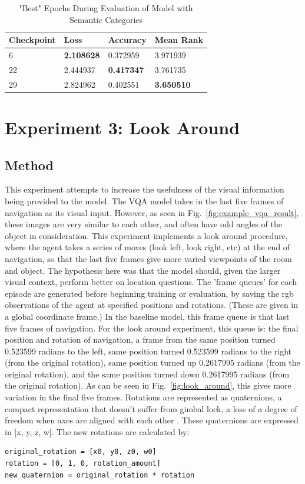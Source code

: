 \begin{table}[H]
\centering
\caption{"Best" Epochs During Evaluation of Model with Semantic Categories}
\begin{tabular}{l | l | l | l}
Checkpoint & Loss & Accuracy & Mean Rank \\
\hline
6 & \textbf{2.108628} & 0.372959 & 3.971939 \\
22 & 2.444937 & \textbf{0.417347} & 3.761735 \\
29 & 2.824962 & 0.402551 & \textbf{3.650510} 
\end{tabular}
\label{tab:best_category}
\end{table}

\section{Experiment 3: Look Around}
\label{sec:exp_3}
\subsection{Method}
This experiment attempts to increase the usefulness of the visual information being provided to the model. The VQA model takes in the last five frames of navigation as its visual input. However, as seen in Fig.~\ref{fig:example_vqa_result}, these images are very similar to each other, and often have odd angles of the object in consideration. This experiment implements a look around procedure, where the agent takes a series of moves (look left, look right, etc) at the end of navigation, so that the last five frames give more varied viewpoints of the room and object. The hypothesis here was that the model should, given the larger visual context, perform better on location questions. \newline
The 'frame queues' for each episode are generated before beginning training or evaluation, by saving the rgb observations of the agent at specified positions and rotations. (These are given in a global coordinate frame.) In the baseline model, this frame queue is that last five frames of navigation. For the look around experiment, this queue is: the final position and rotation of navigation, a frame from the same position turned 0.523599 radians to the left, same position turned 0.523599 radians to the right (from the original rotation), same position turned up 0.2617995 radians (from the original rotation), and the same position turned down 0.2617995 radians (from the original rotation). As can be seen in Fig.~\ref{fig:look_around}, this gives more variation in the final five frames. \newline
Rotations are represented as quaternions, a compact representation that doesn't suffer from gimbal lock, a loss of a degree of freedom when axes are aligned with each other \cite{quaternions}.  These quaternions are expressed in [x, y, z, w]. The new rotations are calculated by: \begin{lstlisting}
original_rotation = [x0, y0, z0, w0] 
rotation = [0, 1, 0, rotation_amount] 
new_quaternion = original_rotation * rotation\end{lstlisting}

